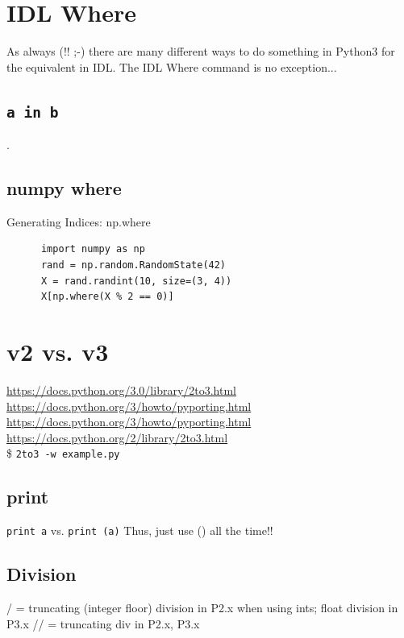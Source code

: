 \documentclass[11pt,a4paper]{article}
\begin{document}
\newpage
\section{IDL Where}
As always (!! ;-) there are many different ways to do something in
Python3 for the equivalent in IDL. The IDL Where command is no
exception...

    \subsection{{\tt a in b}}.


    \subsection{numpy where}
      Generating Indices: np.where
    \begin{lstlisting}
      import numpy as np
      rand = np.random.RandomState(42)
      X = rand.randint(10, size=(3, 4))
      X[np.where(X % 2 == 0)]
    \end{lstlisting}


\newpage
\section{v2 vs. v3}
\href{https://docs.python.org/3.0/library/2to3.html}{https://docs.python.org/3.0/library/2to3.html}\\
\href{https://docs.python.org/3/howto/pyporting.html}{https://docs.python.org/3/howto/pyporting.html}\\
\href{https://docs.python.org/3/howto/pyporting.html}{https://docs.python.org/3/howto/pyporting.html}
\href{https://docs.python.org/2/library/2to3.html}{https://docs.python.org/2/library/2to3.html}\\
\$ {\tt 2to3 -w example.py}\\


    \subsection{print}
    {\tt print a} vs. {\tt print (a)}
    Thus, just use () all the time!!
    
    \subsection{Division}
    / = truncating (integer floor) division in P2.x when using ints; float division in P3.x
    // = truncating div in P2.x, P3.x 
    
\end{document}
